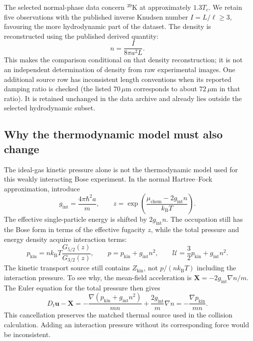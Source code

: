 The selected normal-phase data concern $^{39}$K at approximately $1.3T_c$.
We retain five observations with the published inverse Knudsen number
$I=L/\ell\geq3$, favouring the more hydrodynamic part of the dataset.
The density is reconstructed using the published derived quantity:
\begin{equation}
 n=\frac{I}{8\pi a^2L}.
 \label{qt:densitydata}
\end{equation}
This makes the comparison conditional on that density reconstruction; it is
not an independent determination of density from raw experimental images.
One additional source row has inconsistent length conventions when its
reported damping ratio is checked (the listed $70\,\mu\mathrm m$ corresponds
to about $72\,\mu\mathrm m$ in that ratio). It is retained unchanged in the
data archive and already lies outside the selected hydrodynamic subset.

\subsection{Why the thermodynamic model must also change}
The ideal-gas kinetic pressure alone is not the thermodynamic model used for
this weakly interacting Bose experiment. In the normal Hartree--Fock
approximation, introduce
\begin{equation}
 g_{\mathrm{int}}=\frac{4\pi\hbar^2a}{m},\qquad
 z=\exp\!\left(\frac{\mu_{\mathrm{chem}}-2g_{\mathrm{int}}n}
                         {k_{\mathrm B}T}\right).
\end{equation}
The effective single-particle energy is shifted by $2g_{\mathrm{int}}n$.
The occupation still has the Bose form in terms of the effective fugacity
$z$, while the total pressure and energy density acquire interaction terms:
\begin{equation}
 p_{\mathrm{kin}}=nk_{\mathrm B}T\frac{G_{5/2}(z)}{G_{3/2}(z)},\qquad
 p=p_{\mathrm{kin}}+g_{\mathrm{int}}n^2,\qquad
 \mathcal U=\frac32p_{\mathrm{kin}}+g_{\mathrm{int}}n^2.
\end{equation}
The kinetic transport source still contains $Z_{\mathrm{kin}}$, not
$p/(nk_{\mathrm B}T)$ including the interaction pressure. To see why,
the mean-field acceleration is $\mathbf X=-2g_{\mathrm{int}}\nabla n/m$.
The Euler equation for the total pressure then gives
\[
 D_t\mathbf u-\mathbf X
 =-\frac{\nabla(p_{\mathrm{kin}}+g_{\mathrm{int}}n^2)}{mn}
   +\frac{2g_{\mathrm{int}}}{m}\nabla n
 =-\frac{\nabla p_{\mathrm{kin}}}{mn}.
\]
This cancellation preserves the matched thermal source used in the collision
calculation. Adding an interaction pressure without its corresponding force
would be inconsistent.

